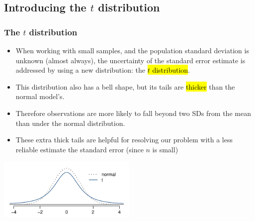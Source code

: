 
\subsection{Introducing the $t$ distribution}


\begin{frame}
\frametitle{The $t$ distribution}

\begin{itemize}

\item When working with small samples, and the population standard deviation is unknown (almost always), the uncertainty of the standard error estimate is addressed by using a new distribution: the \hl{$t$ distribution}.

\pause

\item This distribution also has a bell shape, but its tails are \hl{thicker} than the normal model's.

\pause

\item Therefore observations are more likely to fall beyond two SDs from the mean than under the normal distribution.

\pause

\item These extra thick tails are helpful for resolving our problem with a less reliable estimate the standard error (since $n$ is small)

\end{itemize}

\begin{center}
\includegraphics[width=0.5\textwidth]{5-3_one_t/figures/tDistCompareToNormalDist/tDistCompareToNormalDist}
\end{center}

\end{frame}


